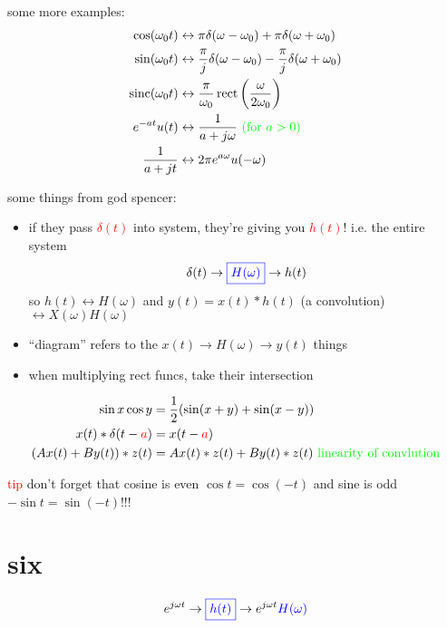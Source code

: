 \documentclass[a5paper, fleqn]{article}
\newcommand{\emf}[1]{\textcolor{red}{#1}}
\newcommand{\note}[1]{\textcolor{green}{#1}}
\newcommand{\eq}[1]{\textcolor{red}{$#1$}}
\DeclareMathOperator{\sinc}{sinc}
\DeclareMathOperator{\rect}{rect}
\begin{document}
some more examples:
\begin{align*}
  \cos(\omega_0 t)  & \leftrightarrow \pi \delta(\omega - \omega_0) + \pi \delta(\omega + \omega_0)                     \\
  \sin(\omega_0 t)  & \leftrightarrow \frac{\pi}{j} \delta(\omega - \omega_0) - \frac{\pi}{j} \delta(\omega + \omega_0) \\
  \sinc(\omega_0 t) & \leftrightarrow \frac{\pi}{\omega_0} \rect\left(\frac{\omega}{2\omega_0}\right)                   \\
  e^{-at} u(t)      & \leftrightarrow \frac{1}{a + j\omega} ~ \note{\text{(for $a > 0$)}}                               \\
  \frac{1}{a + jt}  & \leftrightarrow 2\pi e^{a\omega} u(-\omega)
\end{align*}

some things from god spencer:
\begin{itemize}
  \item if they pass \eq{\delta(t)} into system, they're giving you \eq{h(t)}! i.e. the entire system
        \[\delta(t) \to \textcolor{blue}{\boxed{H(\omega)}} \to h(t)\]
        so $h(t) \leftrightarrow H(\omega)$ and $y(t) = x(t) * h(t)$ (a convolution) $\leftrightarrow X(\omega)H(\omega)$
  \item ``diagram'' refers to the $x(t) \to \boxed{H(\omega)} \to y(t)$ things
  \item when multiplying rect funcs, take their intersection
\end{itemize}
\begin{align*}
  \sin x \cos y              & = \frac{1}{2}(\sin(x + y) + \sin(x - y))                              \\
  x(t) * \delta(t - \emf{a}) & = x(t - \emf{a})                                                      \\
  (Ax(t) + By(t)) * z(t)     & = Ax(t) * z(t) + By(t) * z(t) ~ \note{\text{linearity of convlution}}
\end{align*}

\emf{tip} don't forget that cosine is even $\cos t = \cos(-t)$ and sine is odd $-\sin t = \sin(-t)$!!!

\section*{\textcolor{primary}{six}}

\[e^{j\omega t} \to \textcolor{blue}{\boxed{h(t)}} \to e^{j\omega t} \textcolor{blue}{H(\omega)}\]
\end{document}
